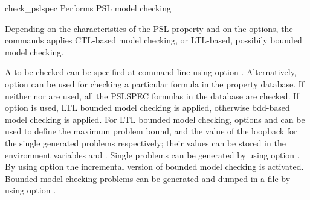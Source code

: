 \begin{nusmvCommand}{check\_pslspec} {Performs PSL model checking}


Depending on the characteristics of the PSL property and on the
options, the commands applies CTL-based model checking, or LTL-based,
possibily bounded model checking.

A \pslexpr to be checked can be specified at command line using option
. Alternatively, option  can be used for
checking a particular formula in the property database. If neither
 nor  are used, all the PSLSPEC formulas
in the database are checked. If option  is used, LTL
bounded model checking is applied, otherwise bdd-based model checking
is applied. For LTL bounded model checking, options  and
 can be used to define the maximum problem bound, and
the value of the loopback for the single generated problems
respectively; their values can be stored in the environment variables
 and . Single
problems can be generated by using option . By using
option  the incremental version of bounded model
checking is activated. Bounded model checking problems can be
generated and dumped in a file by using option .

\begin{cmdOpt}





\end{cmdOpt}
\end{nusmvCommand}
